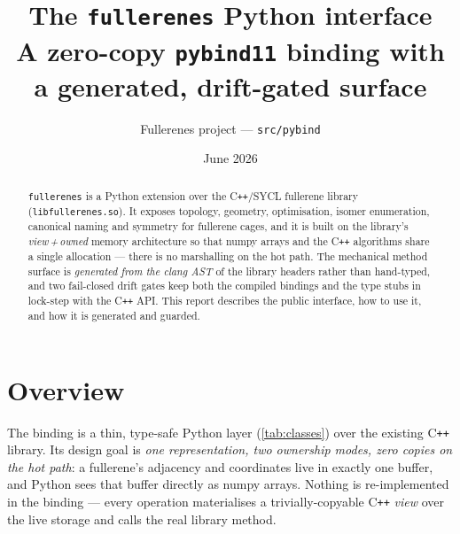 \documentclass[11pt]{article}
\title{\textbf{The \texttt{fullerenes} Python interface}\\[2pt]
\large A zero-copy \texttt{pybind11} binding with a generated, drift-gated surface}
\author{Fullerenes project --- \texttt{src/pybind}}
\date{June 2026}
\begin{document}
\maketitle

\begin{abstract}
\noindent
\texttt{fullerenes} is a Python extension over the C\texttt{++}/SYCL fullerene library
(\texttt{libfullerenes.so}). It exposes topology, geometry, optimisation, isomer
enumeration, canonical naming and symmetry for fullerene cages, and it is built on the
library's \emph{view\,+\,owned} memory architecture so that numpy arrays and the C\texttt{++}
algorithms share a single allocation --- there is no marshalling on the hot path. The
mechanical method surface is \emph{generated from the clang AST} of the library headers
rather than hand-typed, and two fail-closed drift gates keep both the compiled bindings
and the type stubs in lock-step with the C\texttt{++} API. This report describes the
public interface, how to use it, and how it is generated and guarded.
\end{abstract}

\tableofcontents

\section{Overview}

The binding is a thin, type-safe Python layer (\autoref{tab:classes}) over the existing
C\texttt{++} library. Its design goal is \emph{one representation, two ownership modes,
zero copies on the hot path}: a fullerene's adjacency and coordinates live in exactly one
buffer, and Python sees that buffer directly as numpy arrays. Nothing is re-implemented in
the binding --- every operation materialises a trivially-copyable C\texttt{++} \emph{view}
over the live storage and calls the real library method.
\end{document}
